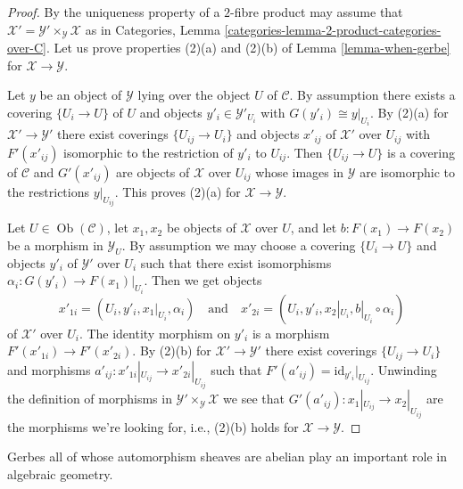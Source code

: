 \documentclass{stacks-project}
\theoremstyle{plain}
\theoremstyle{definition}
\theoremstyle{remark}
\numberwithin{equation}{subsection}
\def\Ob{\mathop{\mathrm{Ob}}\nolimits}
\begin{document}
\begin{proof}
By the uniqueness property of a $2$-fibre product may assume that
$\mathcal{X}' = \mathcal{Y}' \times_\mathcal{Y} \mathcal{X}$
as in
Categories, Lemma \ref{categories-lemma-2-product-categories-over-C}.
Let us prove properties (2)(a) and (2)(b) of
Lemma \ref{lemma-when-gerbe}
for $\mathcal{X} \to \mathcal{Y}$.

\medskip\noindent
Let $y$ be an object of $\mathcal{Y}$ lying over the object $U$
of $\mathcal{C}$. By assumption there exists
a covering $\{U_i \to U\}$ of $U$ and objects
$y'_i \in \mathcal{Y}'_{U_i}$ with $G(y'_i) \cong y|_{U_i}$.
By (2)(a) for $\mathcal{X}' \to \mathcal{Y}'$ there exist
coverings $\{U_{ij} \to U_i\}$ and objects $x'_{ij}$ of
$\mathcal{X}'$ over $U_{ij}$ with $F'(x'_{ij})$ isomorphic
to the restriction of $y'_i$ to $U_{ij}$. Then
$\{U_{ij} \to U\}$ is a covering of $\mathcal{C}$ and
$G'(x'_{ij})$ are objects of $\mathcal{X}$ over $U_{ij}$
whose images in $\mathcal{Y}$ are isomorphic to the restrictions
$y|_{U_{ij}}$. This proves (2)(a) for $\mathcal{X} \to \mathcal{Y}$.

\medskip\noindent
Let $U \in \Ob(\mathcal{C})$, let $x_1, x_2$ be objects of
$\mathcal{X}$ over $U$, and let $b : F(x_1) \to F(x_2)$ be a morphism
in $\mathcal{Y}_U$. By assumption we may choose a covering
$\{U_i \to U\}$ and objects $y'_i$ of $\mathcal{Y}'$
over $U_i$ such that there exist isomorphisms
$\alpha_i : G(y'_i) \to F(x_1)|_{U_i}$.
Then we get objects
$$
x'_{1i} = (U_i, y'_i, x_1|_{U_i}, \alpha_i)
\quad\text{and}\quad
x'_{2i} = (U_i, y'_i, x_2|_{U_i}, b|_{U_i} \circ \alpha_i)
$$
of $\mathcal{X}'$ over $U_i$. The identity morphism on $y'_i$ is a
morphism $F'(x'_{1i}) \to F'(x'_{2i})$. By (2)(b) for
$\mathcal{X}' \to \mathcal{Y}'$ there exist coverings
$\{U_{ij} \to U_i\}$ and morphisms
$a'_{ij} : x'_{1i}|_{U_{ij}} \to x'_{2i}|_{U_{ij}}$
such that $F'(a'_{ij}) = \text{id}_{y'_i}|_{U_{ij}}$. Unwinding the definition
of morphisms in $\mathcal{Y}' \times_\mathcal{Y} \mathcal{X}$
we see that $G'(a'_{ij}) : x_1|_{U_{ij}} \to x_2|_{U_{ij}}$ are
the morphisms we're looking for, i.e., (2)(b) holds for
$\mathcal{X} \to \mathcal{Y}$.
\end{proof}

\noindent
Gerbes all of whose automorphism sheaves are abelian play an important
role in algebraic geometry.
\end{document}

